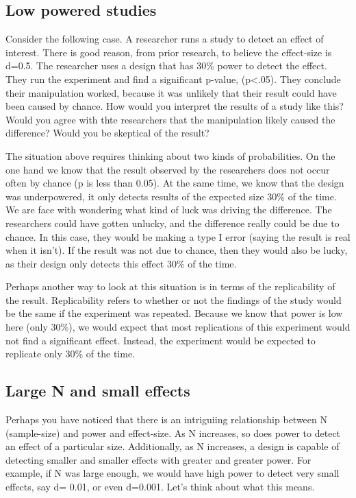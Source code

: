 \documentclass[]{book}
\begin{document}
\hypertarget{low-powered-studies}{%
\subsection{Low powered studies}\label{low-powered-studies}}

Consider the following case. A researcher runs a study to detect an effect of interest. There is good reason, from prior research, to believe the effect-size is d=0.5. The researcher uses a design that has 30\% power to detect the effect. They run the experiment and find a significant p-value, (p\textless{}.05). They conclude their manipulation worked, because it was unlikely that their result could have been caused by chance. How would you interpret the results of a study like this? Would you agree with thte researchers that the manipulation likely caused the difference? Would you be skeptical of the result?

The situation above requires thinking about two kinds of probabilities. On the one hand we know that the result observed by the researchers does not occur often by chance (p is less than 0.05). At the same time, we know that the design was underpowered, it only detects results of the expected size 30\% of the time. We are face with wondering what kind of luck was driving the difference. The researchers could have gotten unlucky, and the difference really could be due to chance. In this case, they would be making a type I error (saying the result is real when it isn't). If the result was not due to chance, then they would also be lucky, as their design only detects this effect 30\% of the time.

Perhaps another way to look at this situation is in terms of the replicability of the result. Replicability refers to whether or not the findings of the study would be the same if the experiment was repeated. Because we know that power is low here (only 30\%), we would expect that most replications of this experiment would not find a significant effect. Instead, the experiment would be expected to replicate only 30\% of the time.

\hypertarget{large-n-and-small-effects}{%
\subsection{Large N and small effects}\label{large-n-and-small-effects}}

Perhaps you have noticed that there is an intriguiing relationship between N (sample-size) and power and effect-size. As N increases, so does power to detect an effect of a particular size. Additionally, as N increases, a design is capable of detecting smaller and smaller effects with greater and greater power. For example, if N was large enough, we would have high power to detect very small effects, say d= 0.01, or even d=0.001. Let's think about what this means.
\end{document}
